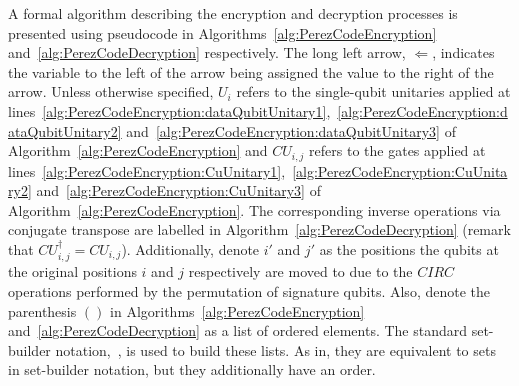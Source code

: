 A formal algorithm describing the encryption and decryption processes is presented using pseudocode in Algorithms~\ref{alg:PerezCodeEncryption} and~\ref{alg:PerezCodeDecryption} respectively. The long left arrow, $\Longleftarrow$, indicates the variable to the left of the arrow being assigned the value to the right of the arrow. Unless otherwise specified, $U_i$ refers to the single-qubit unitaries applied at lines~\ref{alg:PerezCodeEncryption:dataQubitUnitary1},~\ref{alg:PerezCodeEncryption:dataQubitUnitary2} and~\ref{alg:PerezCodeEncryption:dataQubitUnitary3} of Algorithm~\ref{alg:PerezCodeEncryption} and $\mathit{CU}_{i,j}$ refers to the gates applied at lines~\ref{alg:PerezCodeEncryption:CuUnitary1},~\ref{alg:PerezCodeEncryption:CuUnitary2} and~\ref{alg:PerezCodeEncryption:CuUnitary3} of Algorithm~\ref{alg:PerezCodeEncryption}. The corresponding inverse operations via conjugate transpose are labelled in Algorithm~\ref{alg:PerezCodeDecryption} (remark that $\mathit{CU}_{i,j}^{\dagger} = \mathit{CU}_{i,j}$). Additionally, denote $i'$ and $j'$ as the positions the qubits at the original positions $i$ and $j$ respectively are moved to due to the $\mathit{CIRC}$ operations performed by the permutation of signature qubits. Also, denote the parenthesis $()$ in Algorithms~\ref{alg:PerezCodeEncryption} and~\ref{alg:PerezCodeDecryption} as a list of ordered elements. The standard set-builder notation,~\cite{setBuilderNotationWikipedia}, is used to build these lists. As in, they are equivalent to sets in set-builder notation, but they additionally have an order.

